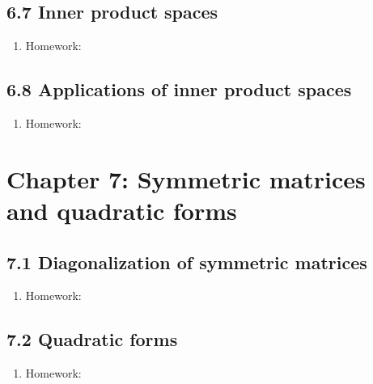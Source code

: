 \documentclass{article}
\begin{document}
\subsection{6.7 Inner product spaces}

\begin{enumerate}

\item Homework: 

\end{enumerate}

\subsection{6.8 Applications of inner product spaces}

\begin{enumerate}

\item Homework: 

\end{enumerate}

\section{Chapter 7: Symmetric matrices and quadratic forms} 

\subsection{7.1 Diagonalization of symmetric matrices}

\begin{enumerate}

\item Homework: 

\end{enumerate}

\subsection{7.2 Quadratic forms}

\begin{enumerate}

\item Homework: 

\end{enumerate}
\end{document}
